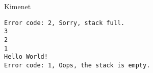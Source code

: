 \documentclass[usenames,dvipsnames,aspectratio=169]{beamer}
\begin{document}
\begin{frame}
    \begin{exampleblock}{}
        \small
        
    \end{exampleblock}
\end{frame}

\begin{frame}[fragile]
    \begin{block}{Kimenet}
        \vspace{-.45cm}
        \small
        \begin{verbatim}
Error code: 2, Sorry, stack full.
3
2
1
Hello World!
Error code: 1, Oops, the stack is empty.
\end{verbatim}
    \vspace{-.45cm}
    \end{block}
\end{frame}
\end{document}

